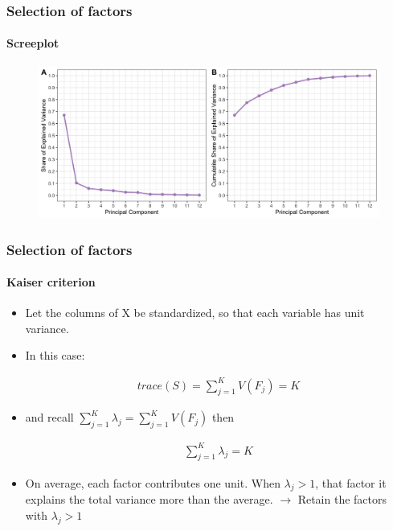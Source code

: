 \documentclass[
  shownotes,
  xcolor={svgnames},
  hyperref={colorlinks,citecolor=DarkBlue,linkcolor=DarkRed,urlcolor=DarkBlue}
  , aspectratio=169]{beamer}
\begin{document}
\begin{frame}
\frametitle{Selection of factors}
\framesubtitle{Screeplot}
 \begin{figure}[H] \centering
            \captionsetup{justification=centering}
              \includegraphics[scale=.15]{figures/plot_S1_LSC2_english}
 \end{figure}
\end{frame}
\begin{frame}
\frametitle{Selection of factors}
\framesubtitle{Kaiser criterion}
\begin{itemize}
\item Let the columns of X be standardized, so that each variable has unit variance. 
\item In this case:

\begin{align}
trace(S) =  \sum_{j=1}^K V(F_j) = K
\end{align}

\item and recall $\sum_{j=1}^K \lambda_j= \sum_{j=1}^K V(F_j)$ then

\begin{align}
 \sum_{j=1}^K \lambda_j = K
\end{align}

\item On average, each factor contributes one unit. When $\lambda_j>1$, that factor it explains the total variance more than the average. $\rightarrow$ Retain the factors with $\lambda_j > 1$ 

\end{itemize}



\end{frame}
\end{document}
